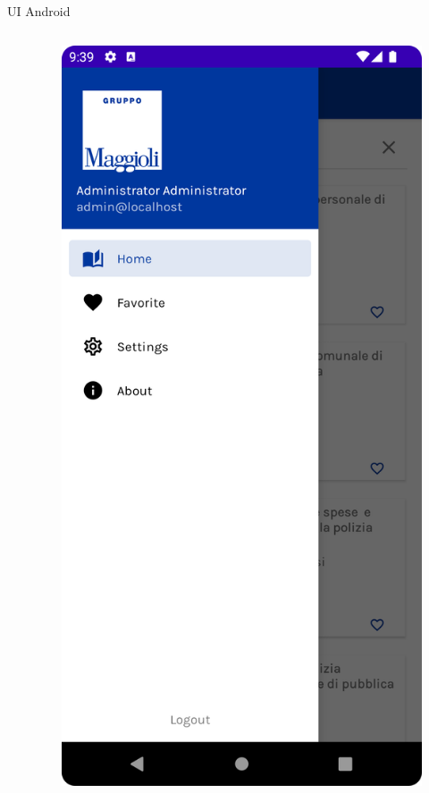 \begin{frame}{UI Android}
\begin{columns}[onlytextwidth]
\begin{column}{0.24\textwidth}
        \end{column}
        \begin{column}{0.24\textwidth}
        
            \begin{figure}[H]
                \includegraphics[width=1\textwidth]{img/sidenav.png}
            \end{figure}
            

\end{column}
\end{columns}
\end{frame}
